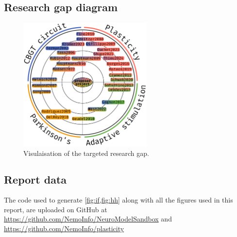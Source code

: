 \subsection{Research gap diagram}
\begin{figure}[ht]
	\centering
	\includegraphics[width=0.6\textwidth]{figs/lit_diagram.pdf}
	\caption{Visulaisation of the targeted research gap.}
\end{figure}

\subsection{Report data}
The code used to generate \cref{fig:if,fig:hh} along with all the figures used in this report, are uploaded on GitHub at
\url{https://github.com/NemoInfo/NeuroModelSandbox} and \\
\url{https://github.com/NemoInfo/plasticity}



